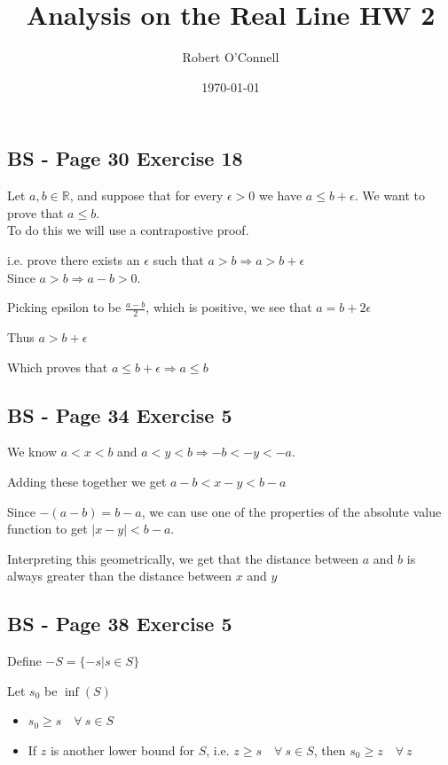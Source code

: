 \documentclass{article}
\title{\textbf{Analysis on the Real Line HW 2}}
\author{Robert O'Connell}
\date{\today}
\begin{document}
\maketitle
\vspace{5mm}

\subsection*{BS - Page 30 Exercise 18}
Let \(a,b \in \mathbb{R}\), and suppose that for every \(\epsilon > 0\) we have
\(a \leq b + \epsilon\). We want to prove that \(a \leq b\).
\\

To do this we will use a contrapostive proof.

i.e. prove there exists an \(\epsilon\) such that \(a>b \Rightarrow a > b + \epsilon\)
\\

Since \(a>b \Rightarrow a-b > 0\).

Picking epsilon to be \(\frac{a-b}{2}\), which is positive, we see that \(a = b + 2\epsilon\)

Thus \(a > b + \epsilon\)

Which proves that \(a \leq b + \epsilon \Rightarrow a \leq b\)

\subsection*{BS - Page 34 Exercise 5}
We know \(a <x <b\) and \(a<y<b \Rightarrow -b < -y < -a\).

Adding these together we get \(a-b < x-y < b-a\)

Since \(-(a-b) = b-a\), we can use one of the properties of the absolute value function to get \(|x-y| < b-a\).

Interpreting this geometrically, we get that the distance between \(a\) and \(b\) is always greater than the distance between 
\(x\) and \(y\)




\subsection*{BS - Page 38 Exercise 5}
Define \(-S = \{-s | s \in S\}\)

Let \(s_0\) be  \(\inf(S)\)
\begin{itemize}
    \item \(s_0 \geq s \quad \forall \ s \in S\)
    \item If \(z\) is another lower bound for \(S\), i.e. \( z \geq s \quad \forall \ s \in S \), then \(s_0 \geq z \quad \forall \ z\)
\end{itemize}
\end{document}
